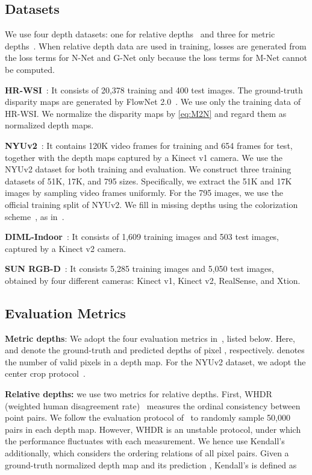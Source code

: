 \documentclass[runningheads]{llncs}
\begin{document}
\subsection{Datasets}
We use four depth datasets: one for relative depths~\cite{xian2020structure} and three for metric depths~\cite{silberman2012indoor,kim2018deep,song2015sun}. When relative depth data are used in training, losses are generated from the loss terms for N-Net and G-Net only because the loss terms for M-Net cannot be computed.

{\noindent \bf HR-WSI}~\cite{xian2020structure}: It consists of 20,378 training and 400 test images. The ground-truth disparity maps are generated by FlowNet 2.0~\cite{ilg2017flownet}. We use only the training data of HR-WSI. We normalize the disparity maps by \eqref{eq:M2N} and regard them as normalized depth maps.

{\noindent \bf NYUv2}~\cite{silberman2012indoor}: It contains 120K video frames for training and 654 frames for test, together with the depth maps captured by a Kinect v1 camera. We use the NYUv2 dataset for both training and evaluation. We construct three training datasets of 51K, 17K, and 795 sizes. Specifically, we extract the 51K and 17K images by sampling video frames uniformly. For the 795 images, we use the official training split of NYUv2. We fill in missing depths using the colorization scheme~\cite{levin2004colorization}, as in~\cite{silberman2012indoor}.

{\noindent \bf DIML-Indoor}~\cite{kim2018deep}: It consists of 1,609 training images and 503 test images, captured by a Kinect v2 camera.

{\noindent \bf SUN RGB-D}~\cite{song2015sun}: It consists 5,285 training images and 5,050 test images, obtained by four different cameras: Kinect v1, Kinect v2, RealSense, and Xtion.

\subsection{Evaluation Metrics}
{\noindent \bf Metric depths}: We adopt the four evaluation metrics in~\cite{eigen2014depth}, listed below. Here,  and  denote the ground-truth and predicted depths of pixel , respectively.  denotes the number of valid pixels in a depth map. For the NYUv2 dataset, we adopt the center crop protocol~\cite{eigen2014depth}.
{\footnotesize
}

{\noindent \bf Relative depths:} we use two metrics for relative depths. First, WHDR (weighted human disagreement rate)~\cite{chen2016single, ranftl2020, xian2020structure} measures the ordinal consistency between point pairs. We follow the evaluation protocol of~\cite{xian2020structure} to randomly sample 50,000 pairs in each depth map. However, WHDR is an unstable protocol, under which the performance fluctuates with each measurement. We hence use Kendall's ~\cite{kendall1938new} additionally, which considers the ordering relations of all pixel pairs. Given a ground-truth normalized depth map  and its prediction , Kendall's  is defined as
\end{document}
